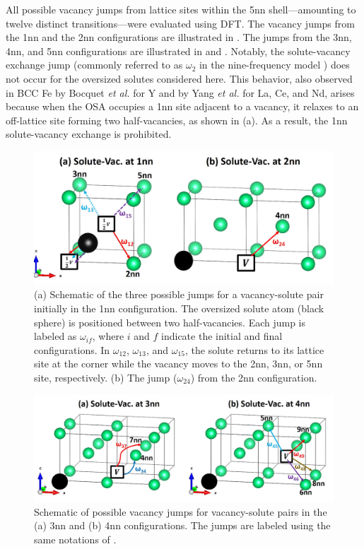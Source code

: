 \documentclass[preprint,12pt]{elsarticle}
\begin{document}
\FloatBarrier

All possible vacancy jumps from lattice sites within the 5nn shell—amounting to twelve distinct transitions—were evaluated using DFT. The vacancy jumps from the 1nn and the 2nn configurations are illustrated in . The jumps from the 3nn, 4nn, and 5nn configurations are illustrated in  and . Notably, the solute-vacancy exchange jump (commonly referred to as $\omega_2$ in the nine-frequency model \cite{leclaire1970}) does not occur for the oversized solutes considered here. This behavior, also observed in BCC Fe by Bocquet \textit{et al.} \cite{bocquet_migration_2017} for Y and by Yang \textit{et al.} \cite{yang_significant_2023} for La, Ce, and Nd, arises because when the OSA occupies a 1nn site adjacent to a vacancy, it relaxes to an off-lattice site forming two half-vacancies, as shown in (a). As a result, the 1nn solute-vacancy exchange is prohibited.

\begin{figure}[!h]
    \centering
    \includegraphics[width=0.8\linewidth]{jumps_Fe_1nn_2nn.jpg}
    \caption{(a) Schematic of the three possible jumps for a vacancy-solute pair initially in the 1nn configuration. The oversized solute atom (black sphere) is positioned between two half-vacancies. Each jump is labeled as $\omega_{if}$, where $i$ and $f$ indicate the initial and final configurations. In $\omega_{12}$, $\omega_{13}$, and $\omega_{15}$, the solute returns to its lattice site at the corner while the vacancy moves to the 2nn, 3nn, or 5nn site, respectively. (b) The jump ($\omega_{24}$) from the 2nn configuration.}
    \label{fig:jumps_all}
\end{figure}

\begin{figure}[h!]
    \centering
    \includegraphics[width=0.95\linewidth]{3nn_and_4nn_jumps_fe.jpg}
    \caption{Schematic of possible vacancy jumps for vacancy-solute pairs in the (a) 3nn and (b) 4nn configurations. The jumps are labeled using the same notations of .}
    \label{fig:jumps_3nn_4nn}
\end{figure}
\end{document}

